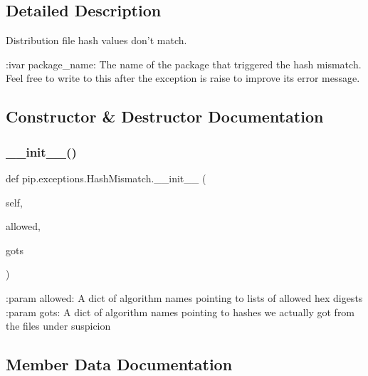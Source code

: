 \subsection{Detailed Description}
\begin{DoxyVerb}Distribution file hash values don't match.

:ivar package_name: The name of the package that triggered the hash
    mismatch. Feel free to write to this after the exception is raise to
    improve its error message.\end{DoxyVerb}
 

\subsection{Constructor \& Destructor Documentation}
\mbox{\label{classpip_1_1exceptions_1_1_hash_mismatch_a93257ed7d14ba873ad101ab089f1046d}} 
\subsubsection{\texorpdfstring{\+\_\+\+\_\+init\+\_\+\+\_\+()}{\_\_init\_\_()}}
{\footnotesize\ttfamily def pip.\+exceptions.\+Hash\+Mismatch.\+\_\+\+\_\+init\+\_\+\+\_\+ (\begin{DoxyParamCaption}\item[{}]{self,  }\item[{}]{allowed,  }\item[{}]{gots }\end{DoxyParamCaption})}

\begin{DoxyVerb}:param allowed: A dict of algorithm names pointing to lists of allowed
    hex digests
:param gots: A dict of algorithm names pointing to hashes we
    actually got from the files under suspicion
\end{DoxyVerb}
 

\subsection{Member Data Documentation}
\mbox{\label{classpip_1_1exceptions_1_1_hash_mismatch_aed474364b861f4940307ca4d80e457ab}} 
